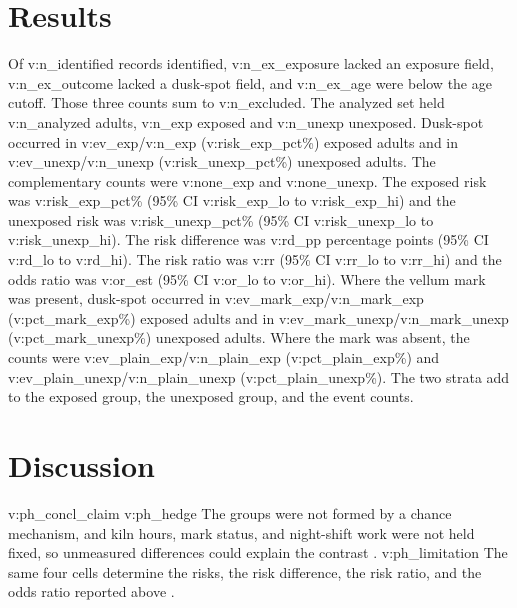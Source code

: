 \documentclass[11pt]{article}
\begin{document}
\section{Results}
Of {{v:n_identified}} records identified, {{v:n_ex_exposure}} lacked an exposure field, {{v:n_ex_outcome}} lacked a dusk-spot field, and {{v:n_ex_age}} were below the age cutoff.
Those three counts sum to {{v:n_excluded}}.
The analyzed set held {{v:n_analyzed}} adults, {{v:n_exp}} exposed and {{v:n_unexp}} unexposed.
Dusk-spot occurred in {{v:ev_exp}}/{{v:n_exp}} ({{v:risk_exp_pct}}\%) exposed adults and in {{v:ev_unexp}}/{{v:n_unexp}} ({{v:risk_unexp_pct}}\%) unexposed adults.
The complementary counts were {{v:none_exp}} and {{v:none_unexp}}.
The exposed risk was {{v:risk_exp_pct}}\% (95\% CI {{v:risk_exp_lo}} to {{v:risk_exp_hi}}) and the unexposed risk was {{v:risk_unexp_pct}}\% (95\% CI {{v:risk_unexp_lo}} to {{v:risk_unexp_hi}}).
The risk difference was {{v:rd_pp}} percentage points (95\% CI {{v:rd_lo}} to {{v:rd_hi}}).
The risk ratio was {{v:rr}} (95\% CI {{v:rr_lo}} to {{v:rr_hi}}) and the odds ratio was {{v:or_est}} (95\% CI {{v:or_lo}} to {{v:or_hi}}).
Where the vellum mark was present, dusk-spot occurred in {{v:ev_mark_exp}}/{{v:n_mark_exp}} ({{v:pct_mark_exp}}\%) exposed adults and in {{v:ev_mark_unexp}}/{{v:n_mark_unexp}} ({{v:pct_mark_unexp}}\%) unexposed adults.
Where the mark was absent, the counts were {{v:ev_plain_exp}}/{{v:n_plain_exp}} ({{v:pct_plain_exp}}\%) and {{v:ev_plain_unexp}}/{{v:n_plain_unexp}} ({{v:pct_plain_unexp}}\%).
The two strata add to the exposed group, the unexposed group, and the event counts.
\section{Discussion}
{{v:ph_concl_claim}}
{{v:ph_hedge}}
The groups were not formed by a chance mechanism, and kiln hours, mark status, and night-shift work were not held fixed, so unmeasured differences could explain the contrast \cite{quill2021}.
{{v:ph_limitation}}
The same four cells determine the risks, the risk difference, the risk ratio, and the odds ratio reported above \cite{moss2020,cedar2017}.
\falsifybibliography
\end{document}
